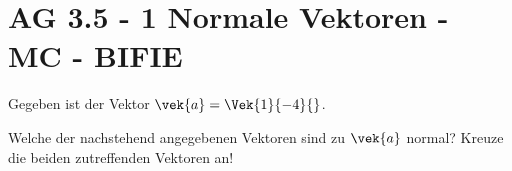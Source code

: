\section{AG 3.5 - 1 Normale Vektoren - MC - BIFIE}

\begin{beispiel}[AG 3.5]{1} %
Gegeben ist der Vektor $\vek{a}=\Vek{1}{-4}{}$.

Welche der nachstehend angegebenen Vektoren sind zu $\vek{a}$ normal?
Kreuze die beiden zutreffenden Vektoren an!
\end{beispiel}